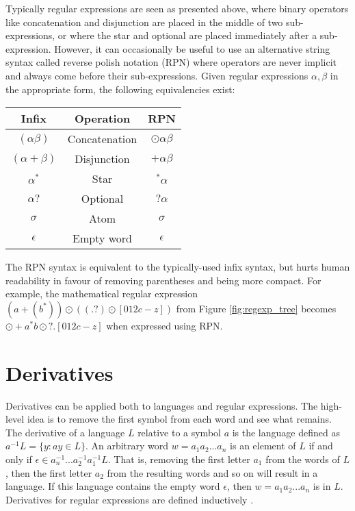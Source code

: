 Typically regular expressions are seen as presented above, where binary operators like concatenation and disjunction are placed in the middle of two sub-expressions, or where the star and optional are placed immediately after a sub-expression. However, it can occasionally be useful to use an alternative string syntax called reverse polish notation (RPN) where operators are never implicit and always come before their sub-expressions. Given regular expressions $\alpha, \beta$ in the appropriate form, the following equivalencies exist:

\begin{center}
  \begin{tabular}{c|c|c}
    Infix             & Operation     & RPN \\
    \hline
    $(\alpha \beta)$  & Concatenation & $\odot \alpha \beta$ \\
    $(\alpha + \beta)$ & Disjunction  & $+ \alpha \beta$ \\
    $\alpha^*$        & Star          & $^* \alpha$ \\
    $\alpha?$         & Optional      & $? \alpha$ \\
    $\sigma$          & Atom          & $\sigma$ \\
    $\epsilon$        & Empty word    & $\epsilon$
  \end{tabular}
\end{center}

The RPN syntax is equivalent to the typically-used infix syntax, but hurts human readability in favour of removing parentheses and being more compact. For example, the mathematical regular expression $(a + (b^*)) \odot ((.?) \odot [012c-z])$ from Figure \ref{fig:regexp_tree} becomes $\odot + a ^*b \odot ? . [012c-z]$ when expressed using RPN.






\section{Derivatives}
\label{sec:Derivatives}
Derivatives can be applied both to languages and regular expressions. The high-level idea is to remove the first symbol from each word and see what remains. The derivative of a language $L$ relative to a symbol $a$ is the language defined as $a^{-1} L = \{y : ay \in L\}$. An arbitrary word $w = a_1a_2...a_n$ is an element of $L$ if and only if $\epsilon \in a_n^{-1}...a_2^{-1}a_1^{-1} L$. That is, removing the first letter $a_1$ from the words of $L$, then the first letter $a_2$ from the resulting words and so on will result in a language. If this language contains the empty word $\epsilon$, then $w = a_1a_2...a_n$ is in $L$. Derivatives for regular expressions are defined inductively \cite{brzozowski1964}. 

